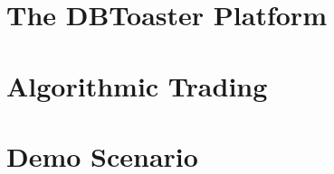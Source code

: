\documentclass{vldb}
\begin{document}



\section{The DBToaster Platform}



\section{Algorithmic Trading}



\section{Demo Scenario}



\footnotesize{


}
\end{document}
